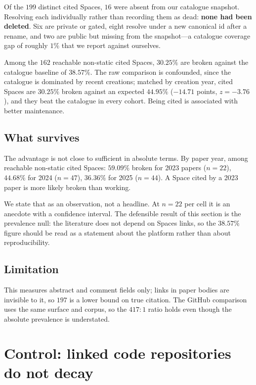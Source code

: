 \documentclass[11pt]{article}
\begin{document}
Of the $199$ distinct cited Spaces, $16$ were absent from our catalogue
snapshot. Resolving each individually rather than recording them as dead:
\textbf{none had been deleted}. Six are private or gated, eight resolve under a
new canonical id after a rename, and two are public but missing from the
snapshot---a catalogue coverage gap of roughly $1\%$ that we report against
ourselves.

Among the $162$ reachable non-static cited Spaces, $30.25\%$ are broken against
the catalogue baseline of $38.57\%$. The raw comparison is confounded, since
the catalogue is dominated by recent creations; matched by creation year, cited
Spaces are $30.25\%$ broken against an expected $44.95\%$
($-14.71$ points, $z = -3.76$), and they beat the catalogue in every cohort.
Being cited is associated with better maintenance.

\subsection{What survives}

The advantage is not close to sufficient in absolute terms. By paper year,
among reachable non-static cited Spaces: $59.09\%$ broken for 2023 papers
($n=22$), $44.68\%$ for 2024 ($n=47$), $36.36\%$ for 2025 ($n=44$). A Space
cited by a 2023 paper is more likely broken than working.

We state that as an observation, not a headline. At $n=22$ per cell it is an
anecdote with a confidence interval. The defensible result of this section is
the prevalence null: the literature does not depend on Spaces links, so the
$38.57\%$ figure should be read as a statement about the platform rather than
about reproducibility.

\subsection{Limitation}

This measures abstract and comment fields only; links in paper bodies are
invisible to it, so $197$ is a lower bound on true citation. The GitHub
comparison uses the same surface and corpus, so the $417{:}1$ ratio holds even
though the absolute prevalence is understated.


\section{Control: linked code repositories do not decay}
\label{sec:control}
\end{document}
